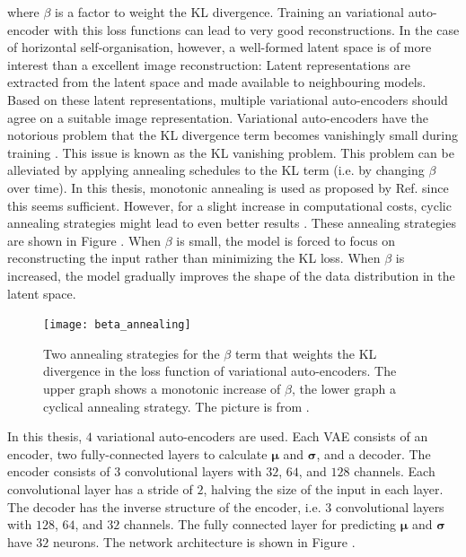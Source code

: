 where $\beta$ is a factor to weight the KL divergence. Training an variational auto-encoder with this loss functions can lead to very good reconstructions.
In the case of horizontal self-organisation, however, a well-formed latent space is of more interest than a excellent image reconstruction: Latent representations are extracted from the latent space and made available to neighbouring models. Based on these latent representations, multiple variational auto-encoders should agree on a suitable image representation.
Variational auto-encoders have the notorious problem that the KL divergence term becomes vanishingly small during training . This issue is known as the KL vanishing problem.
This problem can be alleviated by applying annealing schedules to the KL term (i.e. by changing $\beta$ over time).
In this thesis, monotonic annealing is used as proposed by Ref. \cite{bowman2016generating} since this seems sufficient.
However, for a slight increase in computational costs, cyclic annealing strategies might lead to even better results .
These annealing strategies are shown in Figure . When $\beta$ is small, the model is forced to focus on reconstructing the input rather than minimizing the KL loss.
When $\beta$ is increased, the model gradually improves the shape of the data distribution in the latent space.

\begin{figure}[h]
    \centering
    \texttt{[image: beta\_annealing]}
    \caption[Annealing strategy of the KL weight term in variational auto-encoders]{Two annealing strategies for the $\beta$ term that weights the KL divergence in the loss function of variational auto-encoders. The upper graph shows a monotonic increase of $\beta$, the lower graph a cyclical annealing strategy. The picture is from \cite{Fu_Li_Liu_Gao_Celikyilmaz_Carin_2019}.}
\end{figure}


In this thesis, $4$ variational auto-encoders are used. Each VAE consists of an encoder, two fully-connected layers to calculate $\boldsymbol{\mu}$ and $\boldsymbol{\sigma}$, and a decoder.
The encoder consists of $3$  convolutional layers with $32$, $64$, and $128$ channels. Each convolutional layer has a stride of $2$, halving the size of the input in each layer.
The decoder has the inverse structure of the encoder, i.e. $3$ convolutional layers with $128$, $64$, and $32$ channels.
The fully connected layer for predicting $\boldsymbol{\mu}$ and $\boldsymbol{\sigma}$ have $32$ neurons.
The network architecture is shown in Figure .


